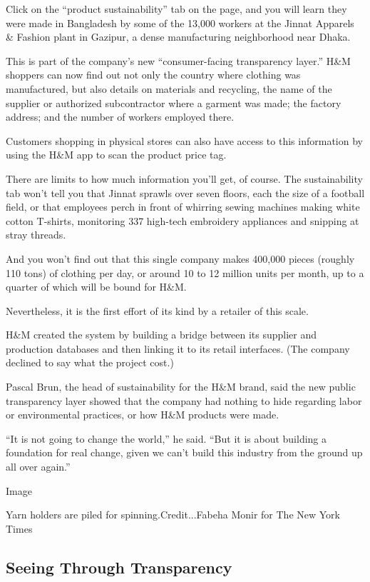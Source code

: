Click on the ``product sustainability'' tab on the page, and you will
learn they were made in Bangladesh by some of the 13,000 workers at the
Jinnat Apparels \& Fashion plant in Gazipur, a dense manufacturing
neighborhood near Dhaka.

This is part of the company's new ``consumer-facing transparency
layer.'' H\&M shoppers can now find out not only the country where
clothing was manufactured, but also details on materials and recycling,
the name of the supplier or authorized subcontractor where a garment was
made; the factory address; and the number of workers employed there.

Customers shopping in physical stores can also have access to this
information by using the H\&M app to scan the product price tag.

There are limits to how much information you'll get, of course. The
sustainability tab won't tell you that Jinnat sprawls over seven floors,
each the size of a football field, or that employees perch in front of
whirring sewing machines making white cotton T-shirts, monitoring 337
high-tech embroidery appliances and snipping at stray threads.

And you won't find out that this single company makes 400,000 pieces
(roughly 110 tons) of clothing per day, or around 10 to 12 million units
per month, up to a quarter of which will be bound for H\&M.

Nevertheless, it is the first effort of its kind by a retailer of this
scale.

H\&M created the system by building a bridge between its supplier and
production databases and then linking it to its retail interfaces. (The
company declined to say what the project cost.)

Pascal Brun, the head of sustainability for the H\&M brand, said the new
public transparency layer showed that the company had nothing to hide
regarding labor or environmental practices, or how H\&M products were
made.

``It is not going to change the world,'' he said. ``But it is about
building a foundation for real change, given we can't build this
industry from the ground up all over again.''

Image

Yarn holders are piled for spinning.Credit...Fabeha Monir for The New
York Times

\hypertarget{seeing-through-transparency}{%
\subsection{Seeing Through
Transparency}\label{seeing-through-transparency}}

